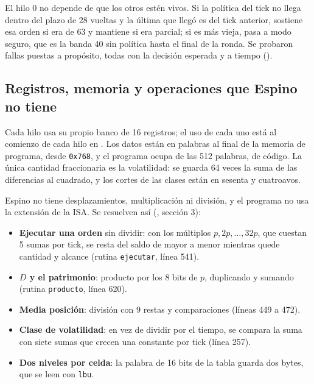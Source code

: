 \begin{table}[!ht]\centering
\caption{Trabajo de cada hilo por tick y ciclo en que publica, ronda 3.}\label{tab:32h}

\end{table}

El hilo 0 no depende de que los otros estén vivos. Si la política del tick no llega dentro del plazo de 28 vueltas y la última que llegó es del tick anterior, sostiene esa orden si era de 63 y mantiene si era parcial; si es más vieja, pasa a modo seguro, que es la banda 40 sin política hasta el final de la ronda. Se probaron \ctresDegradacion{} fallas puestas a propósito, todas con la decisión esperada y a tiempo ().

\subsection{Registros, memoria y operaciones que Espino no tiene}

Cada hilo usa su propio banco de 16 registros; el uso de cada uno está al comienzo de cada hilo en . Los datos están en \ctresPalabrasDatos{} palabras al final de la memoria de programa, desde \texttt{0x768}, y el programa ocupa \ctresPalabras{} de las 512 palabras, \ctresPalabrasCodigo{} de código. La única cantidad fraccionaria es la volatilidad: se guarda 64 veces la suma de las diferencias al cuadrado, y los cortes de las clases están en sesenta y cuatroavos.

Espino no tiene desplazamientos, multiplicación ni división, y el programa no usa la extensión de la ISA. Se resuelven así (, sección 3):
\begin{itemize}
  \item \textbf{Ejecutar una orden} sin dividir: con los múltiplos $p, 2p, \dots, 32p$, que cuestan 5 sumas por tick, se resta del saldo de mayor a menor mientras quede cantidad y alcance (rutina \texttt{ejecutar}, línea 541).
  \item \textbf{$D$ y el patrimonio}: producto por los 8 bits de $p$, duplicando y sumando (rutina \texttt{producto}, línea 620).
  \item \textbf{Media posición}: división con 9 restas y comparaciones (líneas 449 a 472).
  \item \textbf{Clase de volatilidad}: en vez de dividir por el tiempo, se compara la suma con siete sumas que crecen una constante por tick (línea 257).
  \item \textbf{Dos niveles por celda}: la palabra de 16 bits de la tabla guarda dos bytes, que se leen con \texttt{lbu}.
\end{itemize}

